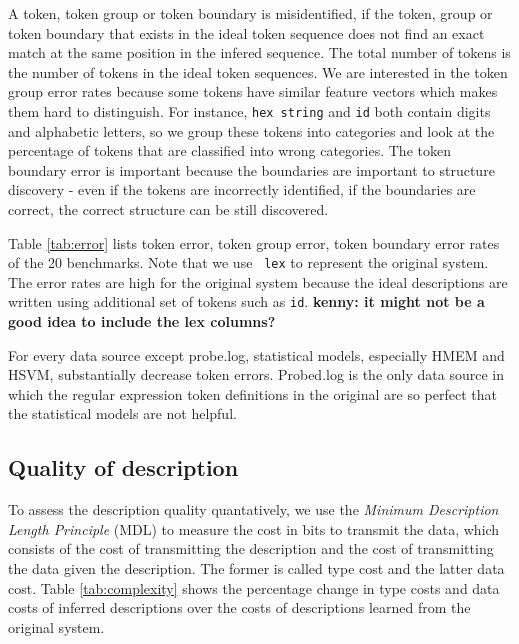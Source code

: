 A token, token group or token boundary
is misidentified, if the token, group or token boundary that exists in the
ideal token sequence does not find an exact match at the same position 
in the infered sequence. 
The total number of tokens is the number of tokens in the ideal token sequences.
We are interested in the token group error rates because
some tokens have similar feature vectors which makes them hard to distinguish. 
For instance, {\tt hex string} and {\tt id} both contain digits and
alphabetic letters, so we group these tokens into categories and
look at the percentage of tokens that are classified into wrong
categories. The token boundary error is important because the boundaries
are important to structure discovery - even if the tokens are incorrectly
identified, if the boundaries are correct, the correct structure can be still
discovered.

Table \ref{tab:error} lists token error, token group error, token
boundary error rates of the 20 benchmarks. Note that we use {\tt
lex} to represent the original \learnpads{} system. The error rates are
high for the original system because the ideal \pads{} descriptions are
written using additional set of tokens such as {\tt id}. 
{\bf kenny: it might not be a good idea to include the lex columns?}

For every data source except probe.log,
statistical models, especially HMEM and HSVM, substantially decrease token errors.
Probed.log is the only data source in which the regular expression
token definitions in the original \learnpads{} are so perfect that
the statistical models are not helpful.

\subsection{Quality of description}

To assess the description quality quantatively, we use the 
{\em Minimum Description Length Principle} (MDL) to 
measure the cost in bits to transmit the
data, which consists of the cost of transmitting the description and
the cost of transmitting the data given the description. The former
is called type cost and the latter data cost. Table \ref{tab:complexity}
shows the percentage change in type costs and data costs of
inferred descriptions over the costs of 
descriptions learned from the original \learnpads{} system.


